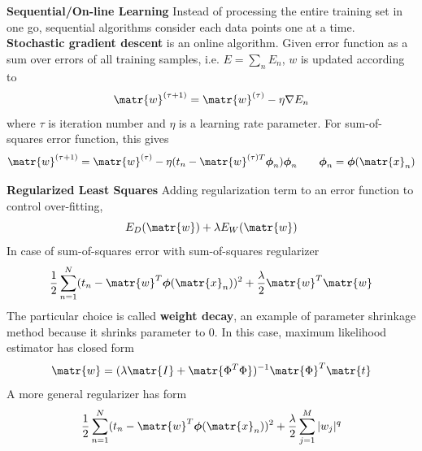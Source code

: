 \documentclass[11pt]{article}
\begin{document}


\begin{defn*}
    \textbf{Sequential/On-line Learning} Instead of processing the entire training set in one go, sequential algorithms consider each data points one at a time. \textbf{Stochastic gradient descent} is an online algorithm. Given error function as a sum over errors of all training samples, i.e. $E = \textstyle\sum_n E_n$, $w$ is updated according to 
    \[
        \matr{w}^{(\tau + 1)} = \matr{w}^{(\tau)} - \eta \nabla E_n
    \]
    where $\tau$ is iteration number and $\eta$ is a learning rate parameter. For sum-of-squares error function, this gives 
    \[
        \matr{w}^{(\tau + 1)} = \matr{w}^{(\tau)} - \eta (t_n - \matr{w}^{(\tau)T} \boldsymbol{\phi}_n)\boldsymbol{\phi}_n
        \quad \quad 
        \boldsymbol{\phi}_n = \boldsymbol{\phi}(\matr{x}_n)
    \]
\end{defn*}


\begin{defn*}
    \textbf{Regularized Least Squares} Adding regularization term to an error function to control over-fitting, 
    \[
        E_D(\matr{w}) + \lambda E_W(\matr{w})
    \]
    In case of sum-of-squares error with sum-of-squares regularizer 
    \[
        \frac{1}{2}\sum_{n=1}^N (t_n - \matr{w}^T \boldsymbol{\phi}(\matr{x}_n))^2 + \frac{\lambda}{2} \matr{w}^T \matr{w}
    \]
    The particular choice is called \textbf{weight decay}, an example of parameter shrinkage method because it shrinks parameter to 0. In this case, maximum likelihood estimator has closed form 
    \[
        \matr{w} = (\lambda \matr{I} + \matr{\Phi^T \Phi})^{-1}\matr{\Phi}^T \matr{t}
    \]
    A more general regularizer has form 
    \[
        \frac{1}{2}\sum_{n=1}^N (t_n - \matr{w}^T \boldsymbol{\phi}(\matr{x}_n))^2 + \frac{\lambda}{2} \sum_{j=1}^M |w_j|^q
    \]
\end{defn*}


\end{document}
